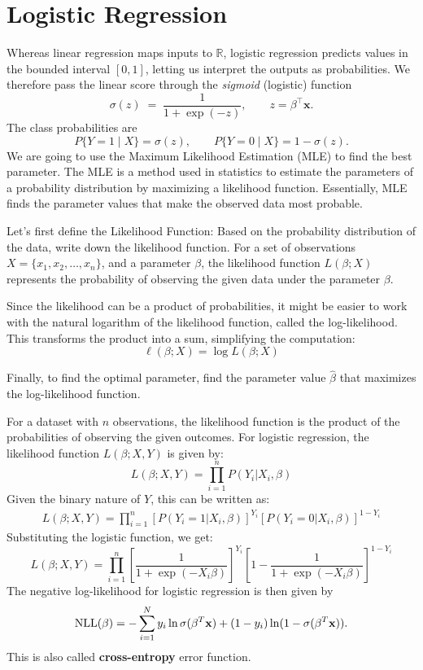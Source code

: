 \section{Logistic Regression}
\label{sec:logistic_regression}


Whereas linear regression maps inputs to $\mathbb{R}$, logistic regression
predicts values in the bounded interval $[0,1]$, letting us interpret the
outputs as probabilities.
We therefore pass the linear score through the \emph{sigmoid} (logistic)
function
\[
  \sigma(z) \;=\; \frac{1}{1+\exp(-z)}, 
  \qquad 
  z = \beta^{\!\top}\mathbf x .
\]
The class probabilities are
\[
  P\!\{Y=1\!\mid\!X\} = \sigma(z),
  \qquad
  P\!\{Y=0\!\mid\!X\} = 1 - \sigma(z).
\]
We are going to use the Maximum Likelihood Estimation (MLE) to find the best parameter. The MLE is a method used in statistics to estimate the parameters of a probability distribution by maximizing a likelihood function. Essentially, MLE finds the parameter values that make the observed data most probable.

Let's first define the Likelihood Function: Based on the probability distribution of the data, write down the likelihood function. For a set of observations \(X = \{x_1, x_2, \ldots, x_n\}\), and a parameter \(\beta\), the likelihood function \(L(\beta; X)\) represents the probability of observing the given data under the parameter \(\beta\).

Since the likelihood can be a product of probabilities, it might be easier to work with the natural logarithm of the likelihood function, called the log-likelihood. This transforms the product into a sum, simplifying the computation:
\[
\ell(\beta; X) = \log L(\beta; X)
\]

Finally, to find the optimal parameter, find the parameter value \(\hat{\beta}\) that maximizes the log-likelihood function.

For a dataset with \( n \) observations, the likelihood function is the product of the probabilities of observing the given outcomes. For logistic regression, the likelihood function \( L(\beta; X, Y) \) is given by:
\[
L(\beta; X, Y) = \prod_{i=1}^{n} P(Y_i | X_i, \beta)
\]
Given the binary nature of \( Y \), this can be written as:
\begin{align*}
	L(\beta; X, Y) = \prod_{i=1}^{n} [P(Y_i = 1 | X_i, \beta)]^{Y_i} [P(Y_i = 0 | X_i, \beta)]^{1 - Y_i}
\end{align*}
Substituting the logistic function, we get:
\[
L(\beta; X, Y) = \prod_{i=1}^{n} \left[\frac{1}{1 + \exp(-X_i \beta)}\right]^{Y_i} \left[1 - \frac{1}{1 + \exp(-X_i \beta)}\right]^{1 - Y_i}
\]
The negative log-likelihood for logistic regression is then given by
\begin{align*}
	\textrm{NLL}(\beta) = -\sum_{i=1}^N y_i\ln\sigma(\beta^T{\mathbf{x}})+(1-y_i)\ln(1-\sigma(\beta^T{\mathbf{x}})).
\end{align*}
This is also called \textbf{cross-entropy} error function. 

